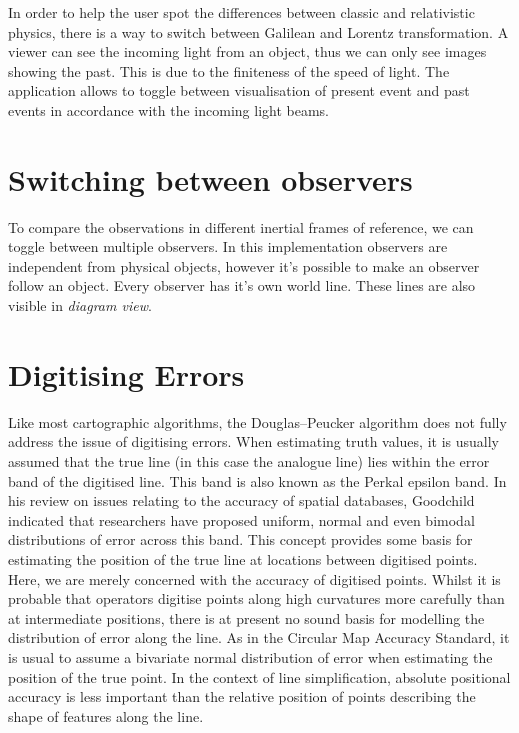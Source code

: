 \documentclass{egpubl}
\begin{document}
In order to help the user spot the differences between classic and relativistic physics, there is a way to switch between Galilean \cite{KHGalilei} and Lorentz transformation. A viewer can see the incoming light from an object, thus we can only see images showing the past. This is due to the finiteness of the speed of light. The application allows to toggle between visualisation of present event and past events in accordance with the incoming light beams.

\section{Switching between observers}
To compare the observations in different inertial frames of reference, we can toggle between multiple observers. In this implementation observers are independent from physical objects, however it's possible to make an observer follow an object. Every observer has it's own world line. These lines are also visible in \emph{diagram view}.




\section{Digitising Errors}
\label{sec:digErr}

Like most cartographic algorithms, the Douglas--Peucker algorithm does not
fully address the issue of digitising errors. When estimating truth values,
it is usually assumed that the true line (in this case the analogue line)
lies within the error band of the digitised line. This band is also known as
the Perkal epsilon band. In his review on issues relating to the accuracy of
spatial databases, Goodchild\cite{Lev90} indicated that researchers have
proposed uniform, normal and even bimodal distributions of error across this
band. This concept provides some basis for estimating the position of the
true line at locations between digitised points. Here, we are merely
concerned with the accuracy of digitised points. Whilst it is probable that
operators digitise points along high curvatures more carefully than at
intermediate positions, there is at present no sound basis for modelling the
distribution of error along the line. As in the Circular Map Accuracy
Standard, it is usual to assume a bivariate normal distribution of error when
estimating the position of the true point. In the context of line
simplification, absolute positional accuracy is less important than the
relative position of points describing the shape of features along the line.
\end{document}
